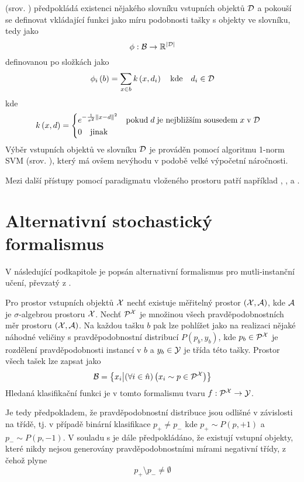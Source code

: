  (srov. \cite{chen_miles:_2006}) předpokládá existenci nějakého slovníku vstupních objektů \( \mathcal D \) a pokouší se definovat vkládající funkci jako míru podobnosti tašky s objekty ve slovníku, tedy jako
\[ \phi : \mathcal B \to \mathbb R^{\left| \mathcal D \right|} \]
definovanou po složkách jako
\[ \phi_i \left( b \right) = \sum_{x \in b} k \left( x, d_i \right) \quad \text{kde} \quad d_i \in \mathcal D \]
kde
\[ k \left( x, d \right) = \begin{cases}
	e^{- \frac{1}{\sigma^2} \left\Vert x - d \right\Vert^2} \quad \text{pokud} \; d \; \text{je nejbližším sousedem} \; x \; \text{v} \; \mathcal D \\
	0 \quad \text{jinak}
\end{cases} \]
Výběr vstupních objektů ve slovníku \( \mathcal D \) je prováděn pomocí algoritmu 1-norm SVM (srov. \cite{zhu_1-norm_2004}), který má ovšem nevýhodu v podobě velké výpočetní náročnosti.

Mezi další přístupy pomocí paradigmatu vloženého prostoru patří například \cite{cheplygina_multiple_2015}, \cite{chen_image_2004}, \cite{foulds_learning_2008} a \cite{zhang_multi-instance_2009}.

\section{Alternativní stochastický formalismus}
V následující podkapitole je popsán alternativní formalismus pro mutli-instanční učení, převzatý z \cite{muandet_learning_2012}.

Pro prostor vstupních objektů \( \mathcal X \) nechť existuje měřitelný prostor \( \left( \mathcal X, \mathcal A \right) \), kde \( \mathcal A \) je \( \sigma \)-algebrou prostoru \( \mathcal X \). Nechť \( \mathcal P^{\mathcal X} \) je množinou všech pravděpodobnostních měr prostoru \( \left( \mathcal X, \mathcal A \right) \). Na každou tašku \( b \) pak lze pohlížet jako na realizaci nějaké náhodné veličiny s pravděpodobnostní distribucí \( P \left( p_b, y_b \right) \), kde \( p_b \in \mathcal P^{\mathcal X} \) je rozdělení pravděpodobnosti instancí v \( b \) a \( y_b \in \mathcal Y \) je třída této tašky. Prostor všech tašek lze zapsat jako
\[ \mathcal B = \left\{ x_i \middle| \left( \forall i \in \hat n \right) \left( x_i \sim p \in \mathcal P^{\mathcal X} \right) \right\} \]
Hledaná klasifikační funkci je v tomto formalismu tvaru \( f : \mathcal P^{\mathcal X} \to \mathcal Y \).

Je tedy předpokladem, že pravděpodobnostní distribuce jsou odlišné v závislosti na třídě, tj. v případě binární klasifikace \( p_+ \neq p_- \) kde \( p_+ \sim P(p, +1) \) a \( p_- \sim P(p, -1) \). V souladu s \cite{dietterich_solving_1997} je dále předpokládáno, že existují vstupní objekty, které nikdy nejsou generovány pravděpodobnostními mírami negativní třídy, z čehož plyne
\[ p_+ \setminus p_- \neq \emptyset \]

